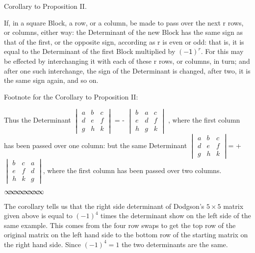 \documentclass[11pt]{article}%
\theoremstyle{definition}
\newcommand{\sep}{\vspace{-3pt} \begin{center}
{\mathversion{normal}
$\infty \mspace{-5.5mu} \infty \mspace{-5.5mu}
\infty \mspace{-5.5mu} \infty \mspace{-5.5mu}
\infty \mspace{-5.5mu} \infty \mspace{-5.5mu}
\infty \mspace{-5.5mu} \infty$}
\end{center} \vspace{-3pt}}
\begin{document}
\begin{center}
\textsf{\bigskip Corollary to Proposition II.}
\end{center}

\textsf{If, in a square Block, a row, or a column, be made to pass over the
next r rows, or columns, either way: the Determinant of the new Block has the
same sign as that of the first, or the opposite sign, according as r is even
or odd: that is, it is equal to the Determinant of the first Block multiplied
by }$\mathsf{(-1)}^{r}.$ \textsf{For this may be effected by interchanging it
with each of these r rows, or columns, in turn; and after one such
interchange, the sign of the Determinant is changed, after two, it is the same
sign again, and so on.}

\bigskip\textsf{Footnote for the Corollary to Proposition II:}

\textsf{Thus the Determinant }$%
\begin{vmatrix}
a & b & c\\
d & e & f\\
g & h & k
\end{vmatrix}
$\textsf{ = - }$%
\begin{vmatrix}
b & a & c\\
e & d & f\\
h & g & k
\end{vmatrix}
$\textsf{ , where the first column has been passed over one column: but the
same Determinant }$%
\begin{vmatrix}
a & b & c\\
d & e & f\\
g & h & k
\end{vmatrix}
$\textsf{= +}$%
\begin{vmatrix}
b & c & a\\
e & f & d\\
h & k & g
\end{vmatrix}
$\textsf{, where the first column has been passed over two columns.}%

\sep


The corollary tells us that the right side determinant of Dodgson's $5\times5$
matrix given above is equal to $(-1)^{4}$ times the determinant show on the
left side of the same example. This comes from the four row swaps to get the
top row of the original matrix on the left hand side to the bottom row of the
starting matrix on the right hand side. Since $(-1)^{4}=1$ the two
determinants are the same.
\end{document}
